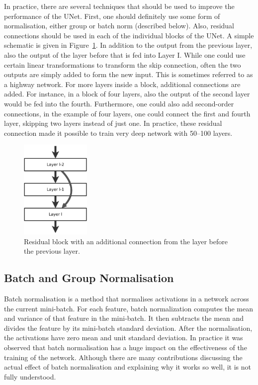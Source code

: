 In practice, there are several techniques that should be used to improve the
performance of the UNet. First, one should definitely use some form of
normalisation, either group or batch norm (described below). Also, residual
connections should be used in each of the individual blocks of the UNet. A
simple schematic is given in Figure~\ref{fig:resblock}. In addition to the
output from the previous layer, also the output of the layer before that is fed
into Layer I. While one could use certain linear transformations to transform
the skip connection, often the two outputs are simply added to form the new
input. This is sometimes referred to as a highway network. For more layers
inside a block, additional connections are added. For instance, in a block of
four layers, also the output of the second layer would be fed into the fourth.
Furthermore, one could also add second-order connections, \ie in the example of
four layers, one could connect the first and fourth layer, skipping two layers
instead of just one. In practice, these residual connection made it possible to
train very deep network with 50--100 layers.

\begin{figure}[htpb]
  \centering
  \includegraphics[width=0.3\textwidth,angle=90,origin=c]{Figures/resblock}
  \caption{Residual block with an additional connection from the layer before
    the previous layer.}%
  \label{fig:resblock}
\end{figure}

\subsection*{Batch and Group Normalisation}
Batch normalisation is a method that normalises activations in a network across
the current mini-batch. For each feature, batch normalization computes the mean
and variance of that feature in the mini-batch. It then subtracts the mean and
divides the feature by its mini-batch standard deviation. After the
normalisation, the activations have zero mean and unit standard deviation. In
practice it was observed that batch normalisation has a huge impact on the
effectiveness of the training of the network. Although there are many
contributions discussing the actual effect of batch normalisation and explaining
why it works so well, it is not fully understood.

